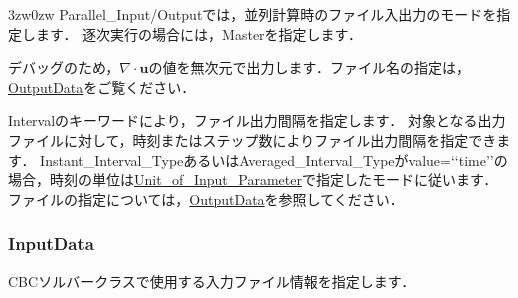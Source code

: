 \begin{indentation}{3zw}{0zw}
Parallel\_Input/Outputでは，並列計算時のファイル入出力のモードを指定します．
逐次実行の場合には，Masterを指定します．

デバッグのため，$\nabla \cdot \bm{u}$の値を無次元で出力します．ファイル名の指定は，\hyperlink{tgt:output_data}{OutputData}をご覧ください．

Intervalのキーワードにより，ファイル出力間隔を指定します．
対象となる出力ファイルに対して，時刻またはステップ数によりファイル出力間隔を指定できます．
Instant\_Interval\_TypeあるいはAveraged\_Interval\_Typeがvalue=\lq\lq time\rq\rq の場合，時刻の単位は\hyperlink{tgt:unit}{Unit\_of\_Input\_Parameter}で指定したモードに従います．
ファイルの指定については，\hyperlink{tgt:output_data}{OutputData}を参照してください．
\end{indentation}



\pagebreak
\subsubsection{InputData}

CBCソルバークラスで使用する\hypertarget{tgt:input_data}{入力ファイル情報}を指定します．

